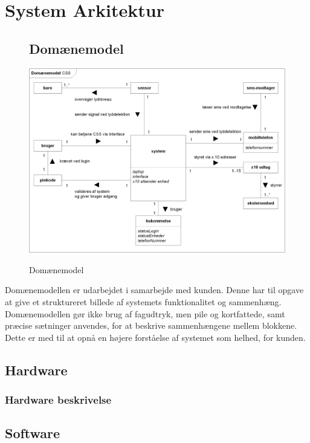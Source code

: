 %
%
\chapter{System Arkitektur}

\begin{figure}[htbp] \centering
\section{Domænemodel}
{\includegraphics[width=\textwidth]{billeder/diagrammer/Domain_Model}}
\caption{Domænemodel}
\label{lab:domainmodel}
\end{figure}
Domænemodellen er udarbejdet i samarbejde med kunden. Denne har til opgave at give et struktureret billede af systemets funktionalitet og sammenhæng. Domænemodellen gør ikke brug af fagudtryk, men pile og kortfattede, samt præcise sætninger anvendes, for at beskrive sammenhængene mellem blokkene. Dette er med til at opnå en højere forståelse af systemet som helhed, for kunden.

\newpage
\section{Hardware}

\subsection{Hardware beskrivelse}


\clearpage
\section{Software}


